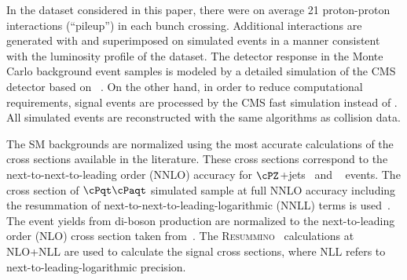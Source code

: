 In the dataset considered in this paper,
there were on average 21 proton-proton interactions (``pileup'') in each bunch crossing.
Additional interactions are generated with \PYTHIA and superimposed on simulated events in a manner consistent with the
luminosity profile of the dataset.
The detector response in the Monte Carlo background event samples is modeled by a
detailed simulation
of the CMS detector based on {\GEANTfour}~\cite{Agostinelli:2002hh}.  
On the other hand, in order to reduce  computational requirements, signal events 
are processed by the CMS fast simulation \cite{Abdullin:2011zz} instead of {\GEANTfour}. 
All simulated events are reconstructed with the same algorithms as collision data.

The SM backgrounds are normalized using the most accurate calculations of the cross sections available 
in the literature. These cross sections correspond to the next-to-next-to-leading order (NNLO) accuracy for $\cPZ$+jets~\cite{Melnikov:2006kv} 
and \wjets~\cite{xsec_WZ} events. The cross section of $\cPqt\cPaqt$ simulated sample at full NNLO accuracy including the resummation of 
next-to-next-to-leading-logarithmic (NNLL) terms is used~\cite{Czakon:2011xx}. 
The event yields from di-boson production are normalized to the next-to-leading order (NLO) cross section  taken from~\cite{Campbell:2011bn}. 
The \textsc{Resummino}~\cite{Fuks:2012qx,Fuks:2013vua,Fuks:2013lya} calculations at NLO+NLL are used to calculate the signal cross sections, where 
NLL refers to next-to-leading-logarithmic precision.
